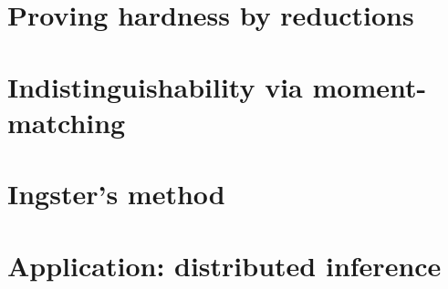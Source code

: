 \documentclass[biber,draft]{nowfnt} %
\begin{document}
\section{Proving hardness by reductions}
\section{Indistinguishability via moment-matching}
\section{Ingster's method}
\section{Application: distributed inference}

%
%
%
%
\end{document}
